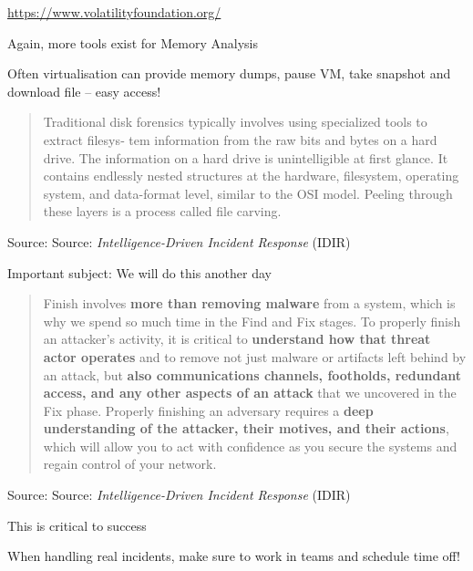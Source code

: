 \documentclass[Screen16to9,17pt]{foils}
\begin{document}
\begin{list2}
\item \url{https://www.volatilityfoundation.org/}
\item Again, more tools exist for Memory Analysis
\item Often virtualisation can provide memory dumps, pause VM, take snapshot and download file -- easy access!
\end{list2}




\begin{quote}
Traditional disk forensics typically involves using specialized tools to extract filesys‐
tem information from the raw bits and bytes on a hard drive. The information on a
hard drive is unintelligible at first glance. It contains endlessly nested structures at the
hardware, filesystem, operating system, and data-format level, similar to the OSI
model. Peeling through these layers is a process called file carving.
\end{quote}
Source: Source: \emph{Intelligence-Driven Incident Response} (IDIR)

\begin{list2}
\item Important subject: We will do this another day
\end{list2}





\begin{quote}
Finish involves {\bf more than removing malware} from a system, which is why we spend
so much time in the Find and Fix stages. To properly finish an attacker’s activity, it is
critical to {\bf understand how that threat actor operates} and to remove not just malware
or artifacts left behind by an attack, but  {\bf also communications channels, footholds,
redundant access, and any other aspects of an attack} that we uncovered in the Fix
phase. Properly finishing an adversary requires a {\bf deep understanding of the attacker,
their motives, and their actions}, which will allow you to act with confidence as you
secure the systems and regain control of your network.
\end{quote}
Source: Source: \emph{Intelligence-Driven Incident Response} (IDIR)


\begin{list2}
\item This is critical to success
\item When handling real incidents, make sure to work in teams and schedule time off!
\end{list2}
\end{document}
